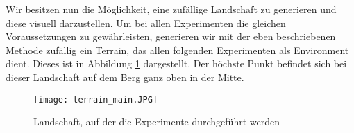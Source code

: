 Wir besitzen nun die Möglichkeit, eine zufällige Landschaft zu generieren und diese visuell darzustellen. Um bei allen Experimenten die gleichen Voraussetzungen zu gewährleisten, generieren wir mit der eben beschriebenen Methode zufällig ein Terrain, das allen folgenden Experimenten als Environment dient. Dieses ist in Abbildung \ref{img:terrainMain} dargestellt. Der höchste Punkt befindet sich bei dieser Landschaft auf dem Berg ganz oben in der Mitte.

\begin{figure}[h]
    \centering
    \texttt{[image: terrain\_main.JPG]}
    \caption{Landschaft, auf der die Experimente durchgeführt werden} \label{img:terrainMain}
\end{figure}